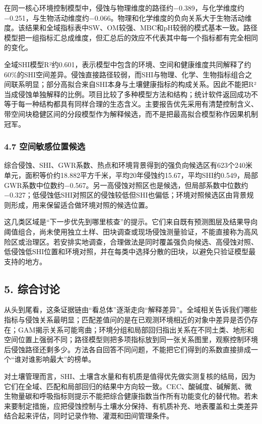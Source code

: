 \documentclass[
  10.5pt,
]{article}
\begin{document}
在同一核心环境控制模型中，侵蚀与物理维度的路径约−0.389，与化学维度约−0.251，与生物活动维度约−0.066。物理和化学维度的负向关系大于生物活动维度。该结果和全域指标表中SW、OM较强、MBC和pH较弱的模式基本一致。路径模型把一组指标汇总成维度，但汇总后的效应不代表其中每一个指标都有完全相同的变化。

全域SHI模型R²约0.601，表示模型中包含的环境、空间和健康维度共同解释了约60\%的SHI空间差异。侵蚀直接路径较弱，而SHI与物理、化学、生物指标组合之间联系明显；部分高拟合来自SHI本身与土壤健康指标的构成关系。因此不能把R²当成侵蚀单独解释的比例。项目比较了多种模型方法和结构；统计软件返回成功不等于每一种结构都具有同样合理的生态含义。主要报告优先采用有清楚控制含义、带空间块稳健区间的分段模型作为解释候选，而不是把最高拟合模型称作因果机制冠军。

\hypertarget{ux7a7aux95f4ux654fux611fux4f4dux7f6eux5019ux9009}{%
\subsubsection{4.7
空间敏感位置候选}\label{ux7a7aux95f4ux654fux611fux4f4dux7f6eux5019ux9009}}

综合侵蚀、SHI、GWR系数、热点和环境背景得到的强负向候选区有623个240米单元，面积等价约18.882平方千米，平均20年侵蚀约15.67，平均SHI约0.549，局部GWR系数中位数约−0.567。另一高侵蚀对照区也是候选，但局部系数中位数约−0.327；低侵蚀低SHI对照区的侵蚀较低但SHI也偏低；环境对照候选区由背景规则形成，用来保留适合做环境对照的候选位置。

这几类区域是``下一步优先到哪里核查''的提示。它们来自既有预测图层及结果导向阈值组合，尚未使用独立土样、田块调查或现场侵蚀测量验证，不能直接称为高风险区或治理区。若安排实地调查，合理做法是同时覆盖强负向候选、高侵蚀对照、低侵蚀低SHI位置和环境对照，并在每类中选择分散的田块，以避免只验证模型最支持的地方。

\hypertarget{ux7efcux5408ux8ba8ux8bba}{%
\subsection{5. 综合讨论}\label{ux7efcux5408ux8ba8ux8bba}}

从头到尾看，这条证据链由``看总体''逐渐走向``解释差异''。全域相关告诉我们哪些指标与侵蚀关系最明显；匹配差值问的是在已观测环境相近的对象中差异是否仍存在；GAM揭示关系可能弯曲；环境分组和局部回归指出关系在不同土类、地形和空间位置上强弱不同；路径模型则把多项指标放到同一张关系图里，观察控制环境后侵蚀路径还剩多少。方法各自回答不同问题，不能把它们得到的系数直接排成一个``谁对谁影响最大''的榜单。

对土壤管理而言，SHI、土壤含水量和有机质是值得优先做实测复核的结局，因为它们在全域、匹配和局部回归的结果中方向较一致。CEC、酸碱度、碱解氮、微生物量碳和呼吸指标则提示不能把综合健康指数当作所有功能变化的替代物。若未来要制定措施，应把侵蚀控制与土壤水分保持、有机质补充、地表覆盖和土类差异结合起来评估，同时记录作物、灌溉和田间管理条件。
\end{document}

